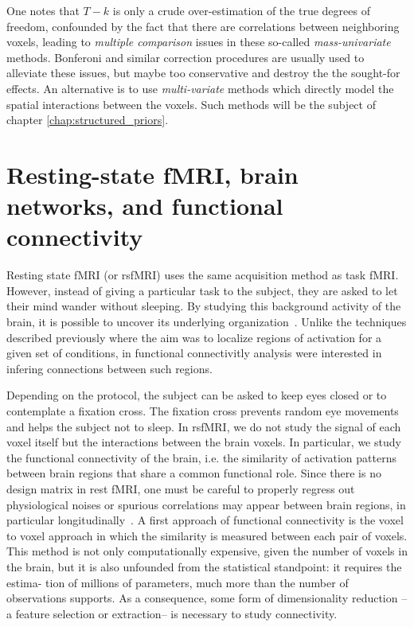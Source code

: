 One notes that $T-k$ is only a crude over-estimation of the true degrees of freedom, confounded by the fact that there are correlations between neighboring voxels, leading to \textit{multiple comparison} issues in these so-called \textit{mass-univariate} methods. Bonferoni and similar correction procedures are usually used to alleviate these issues, but maybe too conservative and destroy the the sought-for effects. An alternative is to use \textit{multi-variate} methods which directly model the spatial interactions between the voxels. Such methods will be the subject of chapter \ref{chap:structured_priors}.

\section{Resting-state fMRI, brain networks, and functional connectivity}
\label{rsfmri}
Resting state fMRI (or rsfMRI) uses the same acquisition method as task fMRI.
However, instead of giving a particular task to the subject, they are asked to let their mind wander without sleeping. By studying this background activity of
the brain, it is possible to uncover its underlying organization~\citep{raichle10}. Unlike the techniques described previously where the aim was to localize regions of activation for a given set of conditions, in functional connectivitly analysis were interested in infering connections between such regions.

Depending on the protocol, the subject can be asked to keep eyes closed or
to contemplate a fixation cross. The fixation cross prevents random eye movements
and helps the subject not to sleep.
In rsfMRI, we do not study the signal of each voxel itself but the
interactions between the brain voxels. In particular, we study the functional
connectivity of the brain, i.e. the similarity of activation patterns between
brain regions that share a common functional role. Since there is no design
matrix in rest fMRI, one must be careful to properly regress out physiological
noises or spurious correlations may appear between brain regions, in particular
longitudinally~\citep{power2012,vandijk2012}.
A first approach of functional connectivity is the voxel to voxel approach in
which the similarity is measured between each pair of voxels. This method is
not only computationally expensive, given the number of voxels in the brain,
but it is also unfounded from the statistical standpoint: it requires the estima-
tion of millions of parameters, much more than the number of observations
supports. As a consequence, some form of dimensionality reduction --a feature
selection or extraction-- is necessary to study connectivity.

